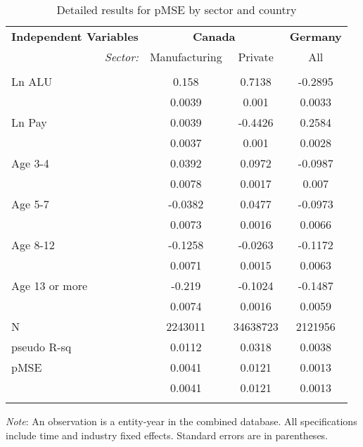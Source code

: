 
\begin{table}[!htbp] \centering 
\setlength{\tabcolsep}{11pt}
\begin{threeparttable}
  \caption{Detailed results for pMSE by sector and country} 
  \label{tab:pmse:details} 
\begin{tabular}{@{\extracolsep{5pt}} l|cc|c} 
\toprule
\textbf{Independent Variables} & \multicolumn{2}{c}{\textbf{Canada}} & \textbf{Germany}\\
\multicolumn{1}{r}{\it Sector:}&Manufacturing & Private & All \\ 
\hline \\[-1.8ex] 
Ln ALU & 0.158 & 0.7138 & -0.2895 \\ 
 & 0.0039 & 0.001 & 0.0033 \\ 
Ln Pay & 0.0039 & -0.4426 & 0.2584 \\ 
 & 0.0037 & 0.001 & 0.0028 \\ 
Age 3-4 & 0.0392 & 0.0972 & -0.0987 \\ 
 & 0.0078 & 0.0017 & 0.007 \\ 
Age 5-7 & -0.0382 & 0.0477 & -0.0973 \\ 
 & 0.0073 & 0.0016 & 0.0066 \\ 
Age 8-12 & -0.1258 & -0.0263 & -0.1172 \\ 
 & 0.0071 & 0.0015 & 0.0063 \\ 
Age 13 or more & -0.219 & -0.1024 & -0.1487 \\ 
 & 0.0074 & 0.0016 & 0.0059 \\ 
N & 2243011 & 34638723 & 2121956 \\ 
pseudo R-sq & 0.0112 & 0.0318 & 0.0038 \\ 
pMSE & 0.0041 & 0.0121 & 0.0013 \\ 
 & 0.0041 & 0.0121 & 0.0013 \\ 
\hline \\[-1.8ex] 
\end{tabular} 
\begin{tablenotes}
\small
\item \textit{Note}: An observation is a entity-year in the combined database. All specifications include  time and industry fixed effects. Standard errors are in parentheses. 
\end{tablenotes}
\end{threeparttable}
\end{table} 
